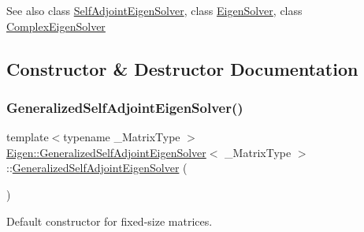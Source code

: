 \begin{DoxySeeAlso}{See also}
class \mbox{\hyperlink{class_eigen_1_1_self_adjoint_eigen_solver}{Self\+Adjoint\+Eigen\+Solver}}, class \mbox{\hyperlink{class_eigen_1_1_eigen_solver}{Eigen\+Solver}}, class \mbox{\hyperlink{class_eigen_1_1_complex_eigen_solver}{Complex\+Eigen\+Solver}} 
\end{DoxySeeAlso}


\subsection{Constructor \& Destructor Documentation}
\mbox{\label{class_eigen_1_1_generalized_self_adjoint_eigen_solver_a501effdbf722c0609ea05ff3fd4cc721}} 
\subsubsection{\texorpdfstring{GeneralizedSelfAdjointEigenSolver()}{GeneralizedSelfAdjointEigenSolver()}\hspace{0.1cm}{\footnotesize\ttfamily [1/3]}}
{\footnotesize\ttfamily template$<$typename \+\_\+\+Matrix\+Type $>$ \\
\mbox{\hyperlink{class_eigen_1_1_generalized_self_adjoint_eigen_solver}{Eigen\+::\+Generalized\+Self\+Adjoint\+Eigen\+Solver}}$<$ \+\_\+\+Matrix\+Type $>$\+::\mbox{\hyperlink{class_eigen_1_1_generalized_self_adjoint_eigen_solver}{Generalized\+Self\+Adjoint\+Eigen\+Solver}} (\begin{DoxyParamCaption}{ }\end{DoxyParamCaption})\hspace{0.3cm}{\ttfamily [inline]}}



Default constructor for fixed-\/size matrices. 

